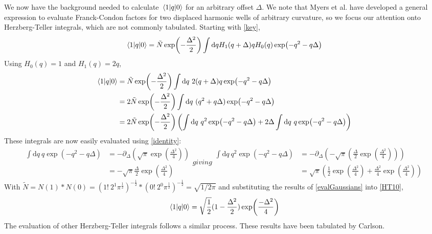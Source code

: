 \documentclass[aip, jcp, reprint, onecolumn, nofootinbib]{revtex4-2}
\begin{document}
We now have the background needed to calculate $\mel{1}{q}{0}$ for an arbitrary offset $\Delta$.
We note that Myers et al. have developed a general expression to evaluate Franck-Condon factors for two displaced harmonic wells of arbitrary curvature,\cite{Myers1982} so we focus our attention onto Herzberg-Teller integrals, which are not commonly tabulated.
Starting with \autoref{key},
\begin{equation}
\begin{split}
	\mel{1}{q}{0} = \tilde{N} \exp(-\frac{\Delta^2}{2}) \int \mathrm{d}q H_1(q+\Delta) q H_0(q) \exp(-q^2 - q\Delta)
\end{split}
\end{equation}
Using $H_0(q) = 1$ and $H_1(q) = 2q$,\cite{RN230} 
\begin{equation}\label{HT10}
	\begin{split}
		\mel{1}{q}{0} &= \tilde{N} \exp(-\frac{\Delta^2}{2}) \int \mathrm{d}q \ 2(q + \Delta) q \exp(-q^2 - q\Delta)\\
		&= 2\tilde{N} \exp(-\frac{\Delta^2}{2}) \int \mathrm{d}q \ (q^2 + q \Delta) \exp(-q^2 - q\Delta)\\
		&=  2\tilde{N} \exp(-\frac{\Delta^2}{2}) \left(\int \mathrm{d}q \ q^2 \exp(-q^2 - q\Delta) + 2\Delta \int \mathrm{d}q \ q \exp(-q^2 - q\Delta) \right)
	\end{split}
\end{equation}
These integrals are now easily evaluated using \autoref{identity}:
\begin{subequations}\label{evalGaussians}
	\begin{equation}
		\begin{split}
					\int \mathrm{d}q \ q \exp(-q^2 - q\Delta) &= -\partial_{\Delta} \left(\sqrt{\pi} \exp(\frac{\Delta^2}{4})\right)\\
					& = -\sqrt{\pi} \frac{\Delta}{2} \exp(\frac{\Delta^2}{4})
		\end{split}
	\end{equation}
giving
\begin{equation}
	\begin{split}
		\int \mathrm{d}q \ q^2 \exp(-q^2 - q\Delta) &= -\partial_{\Delta} \left(-\sqrt{\pi} \left(\frac{\Delta}{2} \exp(\frac{\Delta^2}{4})\right)\right)\\
		& =\sqrt{\pi} \left(\frac{1}{2}\exp(\frac{\Delta^2}{4}) + \frac{\Delta^2}{4} \exp(\frac{\Delta^2}{4})\right)
	\end{split}
\end{equation}
\end{subequations}
With $\tilde{N} = N(1)*N(0) = (1! \ 2^1 \pi^{\frac{1}{2}})^{-\frac{1}{2}} * (0! \ 2^0 \pi^{\frac{1}{2}})^{-\frac{1}{2}} = \sqrt{1/2\pi}$ and substituting the results of \autoref{evalGaussians} into \autoref{HT10}, 
\begin{equation}
	\mel{1}{q}{0} = \sqrt{\frac{1}{2}} (1 - \frac{\Delta^2}{2}) \exp(\frac{-\Delta^2}{4})
\end{equation}
The evaluation of other Herzberg-Teller integrals follows a similar process.
These results have been tabulated by Carlson. \cite{Carlson1988thesis}
\end{document}
